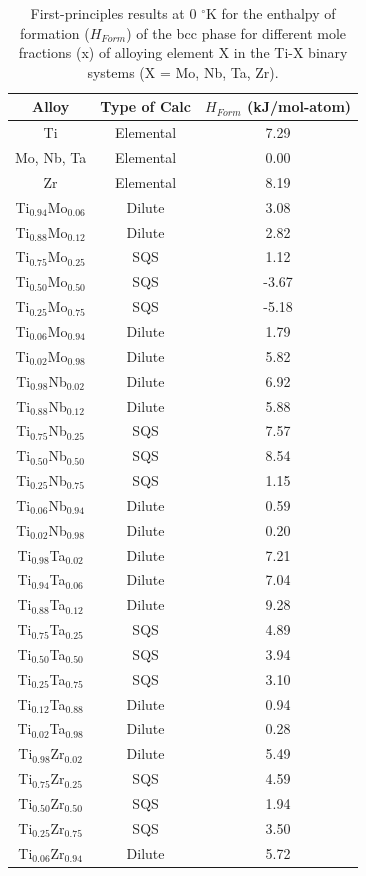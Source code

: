 \newpage
\begin{table}[H]
	\caption{First-principles results at 0 $^{\circ}$K for the enthalpy of formation ($H_{Form}$) of the bcc phase for different mole fractions (x) of alloying element X in the Ti-X binary systems (X = Mo, Nb, Ta, Zr).}
	\centering
	\begin{tabular}{ c c c }
		\hline
		Alloy & Type of Calc & $H_{Form}$ (kJ/mol-atom)\\
		\hline
		Ti & Elemental & 7.29\\
		Mo, Nb, Ta & Elemental & 0.00\\
		Zr & Elemental & 8.19\\
		Ti$_{0.94}$Mo$_{0.06}$ & Dilute & 3.08\\
		Ti$_{0.88}$Mo$_{0.12}$ & Dilute & 2.82\\
		Ti$_{0.75}$Mo$_{0.25}$ & SQS & 1.12\\
		Ti$_{0.50}$Mo$_{0.50}$ & SQS & -3.67\\
		Ti$_{0.25}$Mo$_{0.75}$ & SQS & -5.18\\
		Ti$_{0.06}$Mo$_{0.94}$ & Dilute & 1.79\\
		Ti$_{0.02}$Mo$_{0.98}$ & Dilute & 5.82\\
		Ti$_{0.98}$Nb$_{0.02}$ & Dilute & 6.92\\
		Ti$_{0.88}$Nb$_{0.12}$ & Dilute & 5.88\\ 
		Ti$_{0.75}$Nb$_{0.25}$ & SQS & 7.57\\
		Ti$_{0.50}$Nb$_{0.50}$ & SQS & 8.54\\
		Ti$_{0.25}$Nb$_{0.75}$ & SQS & 1.15\\
		Ti$_{0.06}$Nb$_{0.94}$ & Dilute & 0.59\\
		Ti$_{0.02}$Nb$_{0.98}$ & Dilute & 0.20\\
		Ti$_{0.98}$Ta$_{0.02}$ & Dilute & 7.21\\
		Ti$_{0.94}$Ta$_{0.06}$ & Dilute & 7.04\\
		Ti$_{0.88}$Ta$_{0.12}$ & Dilute & 9.28\\
		Ti$_{0.75}$Ta$_{0.25}$ & SQS & 4.89\\
		Ti$_{0.50}$Ta$_{0.50}$ & SQS & 3.94\\
		Ti$_{0.25}$Ta$_{0.75}$ & SQS & 3.10\\
		Ti$_{0.12}$Ta$_{0.88}$ & Dilute & 0.94\\
		Ti$_{0.02}$Ta$_{0.98}$ & Dilute & 0.28\\
		Ti$_{0.98}$Zr$_{0.02}$ & Dilute & 5.49\\
		Ti$_{0.75}$Zr$_{0.25}$ & SQS & 4.59\\
		Ti$_{0.50}$Zr$_{0.50}$ & SQS & 1.94\\
		Ti$_{0.25}$Zr$_{0.75}$ & SQS & 3.50\\
		Ti$_{0.06}$Zr$_{0.94}$ & Dilute & 5.72\\
		\hline
	\end{tabular}
    \label{Ch3-table:binaryhform}
\end{table}
\clearpage

